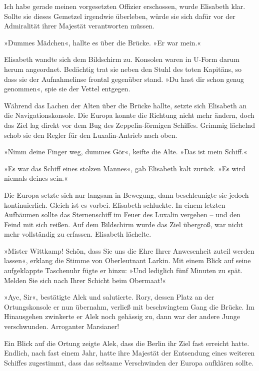 Ich habe gerade meinen vorgesetzten Offizier erschossen, wurde
Elisabeth klar. Sollte sie dieses Gemetzel irgendwie überleben,
würde sie sich dafür vor der Admiralität ihrer Majestät
verantworten müssen.

\bigpar

»Dummes Mädchen«, hallte es über die Brücke. »Er war mein.«

Elisabeth wandte sich dem Bildschirm zu. Konsolen waren in U-Form
darum herum angeordnet. Bedächtig trat sie neben den Stuhl des
toten Kapitäns, so dass sie der Aufnahmelinse frontal gegenüber
stand. »Du hast dir schon genug genommen«, spie sie der Vettel
entgegen.

Während das Lachen der Alten über die Brücke hallte, setzte sich
Elisabeth an die Navigationskonsole. Die Europa konnte die Richtung
nicht mehr ändern, doch das Ziel lag direkt vor dem Bug des
Zeppelin-förmigen Schiffes. Grimmig lächelnd schob sie den Regler
für den Luxalin-Antrieb nach oben.

»Nimm deine Finger weg, dummes Gör«, keifte die Alte. »Das ist mein
Schiff.«

»Es war das Schiff eines stolzen Mannes«, gab Elisabeth kalt
zurück. »Es wird niemals deines sein.«

\bigpar

Die Europa setzte sich nur langsam in Bewegung, dann beschleunigte
sie jedoch kontinuierlich. Gleich ist es vorbei. Elisabeth
schluckte. In einem letzten Aufbäumen sollte das Sternenschiff im
Feuer des Luxalin vergehen – und den Feind mit sich reißen. Auf dem
Bildschirm wurde das Ziel übergroß, war nicht mehr vollständig zu
erfassen. Elisabeth lächelte.


»Mister Wittkamp! Schön, dass Sie uns die Ehre Ihrer Anwesenheit
zuteil werden lassen«, erklang die Stimme von Oberleutnant Larkin.
Mit einem Blick auf seine aufgeklappte Taschenuhr fügte er hinzu:
»Und lediglich fünf Minuten zu spät. Melden Sie sich nach Ihrer
Schicht beim Obermaat!«

»Aye, Sir«, bestätigte Alek und salutierte. Rory, dessen Platz an
der Ortungskonsole er nun übernahm, verließ mit beschwingtem Gang
die Brücke. Im Hinausgehen zwinkerte er Alek noch gehässig zu, dann
war der andere Junge verschwunden. Arroganter Marsianer!

Ein Blick auf die Ortung zeigte Alek, dass die Berlin ihr Ziel fast
erreicht hatte. Endlich, nach fast einem Jahr, hatte ihre Majestät
der Entsendung eines weiteren Schiffes zugestimmt, dass das
seltsame Verschwinden der Europa aufklären sollte.

